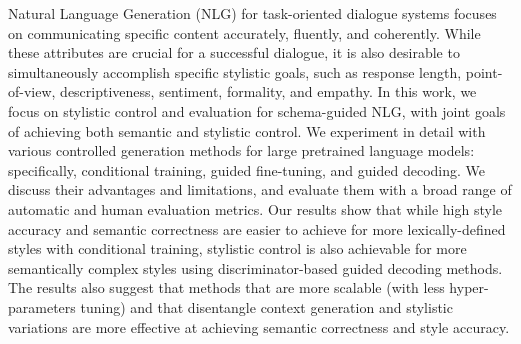 Natural Language Generation (NLG) for task-oriented dialogue systems focuses on communicating specific content accurately, fluently, and coherently. While these attributes are crucial for a successful dialogue, it is also desirable to simultaneously accomplish specific stylistic goals, such as response length, point-of-view, descriptiveness, sentiment, formality, and empathy. In this work, we focus on stylistic control and evaluation for schema-guided NLG, with joint goals of achieving both semantic and stylistic control. We experiment in detail with various controlled generation methods for large pretrained language models: specifically, conditional training, guided fine-tuning, and guided decoding. We discuss their advantages and limitations, and evaluate them with a broad range of automatic and human evaluation metrics. Our results show that while high style accuracy and semantic correctness are easier to achieve for more lexically-defined styles with conditional training, stylistic control is also achievable for more semantically complex styles using discriminator-based guided decoding methods. The results also suggest that methods that are more scalable (with less hyper-parameters tuning) and that disentangle context generation and stylistic variations are more effective at achieving semantic correctness and style accuracy.

